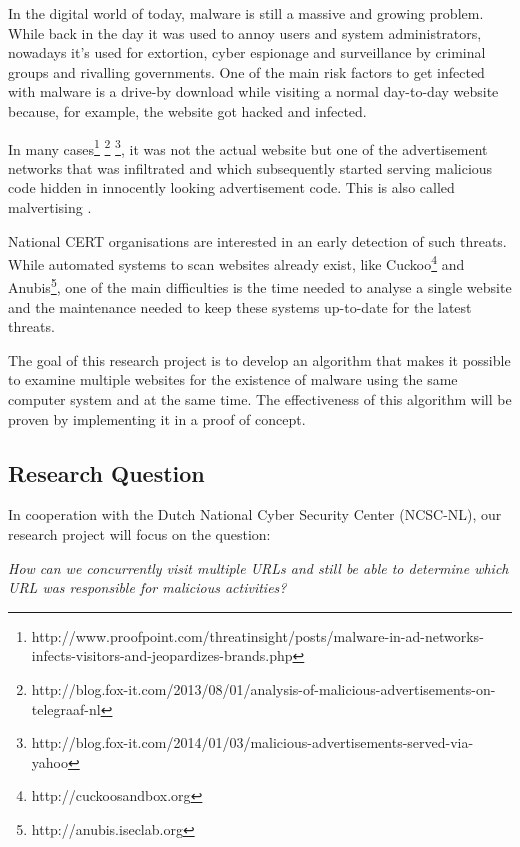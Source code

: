 
In the digital world of today, malware is still a massive and growing problem. While back in the day it was used to annoy users and system administrators, nowadays it's used for extortion, cyber espionage and surveillance by criminal groups and rivalling governments. One of the main risk factors to get infected with malware is a drive-by download while visiting a normal day-to-day website because, for example, the website got hacked and infected. 

In many cases\footnote{http://www.proofpoint.com/threatinsight/posts/malware-in-ad-networks-infects-visitors-and-jeopardizes-brands.php} \footnote{http://blog.fox-it.com/2013/08/01/analysis-of-malicious-advertisements-on-telegraaf-nl} \footnote{http://blog.fox-it.com/2014/01/03/malicious-advertisements-served-via-yahoo}, it was not the actual website but one of the advertisement networks that was infiltrated and which subsequently started serving malicious code hidden in innocently looking advertisement code. This is also called malvertising \cite{Li2012}.

National CERT organisations are interested in an early detection of such threats. While automated systems to scan websites already exist, like Cuckoo\footnote{http://cuckoosandbox.org} and Anubis\footnote{http://anubis.iseclab.org}, one of the main difficulties is the time needed to analyse a single website and the maintenance needed to keep these systems up-to-date for the latest threats.

The goal of this research project is to develop an algorithm that makes it possible to examine multiple websites for the existence of malware using the same computer system and at the same time. The effectiveness of this algorithm will be proven by implementing it in a proof of concept.



\subsection{Research Question}

In cooperation with the Dutch National Cyber Security Center (NCSC-NL), our research project will focus on the question:

\textit{How can we concurrently visit multiple URLs and still be able to determine which URL was responsible for malicious activities?}

